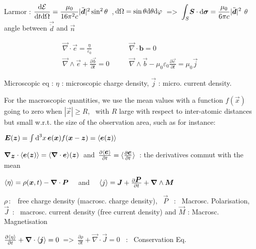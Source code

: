 \item Larmor : $\dfrac{\textrm{d} \mathcal{E}}{\textrm{d} t\textrm{d} \Omega} = \dfrac{\mu_0}{16\pi^2c}|\ddot{\mbox{\boldmath$d$}}|^2\sin^2\theta$ \,,$\,\textrm{d} \Omega = \sin\theta\textrm{d} \theta\textrm{d} \varphi \, $ => $\, \displaystyle{\int_{S}} \mbox{\boldmath$S$}\cdot\mbox{\boldmath$\textrm{d} \sigma$} = \dfrac{\mu_0}{6\pi c} |\ddot{\mbox{\boldmath$d$}}|^2$  $\theta$ angle between $ \vec{\ddot{d}}$ and $ \vec{n}$
\squishend

\squishlist
\item[] $$\boxed{\begin{split}
	\vec{\nabla}\cdot\vec{e} = \frac{\eta}{\varepsilon_0}  \qquad &\vec{\nabla} \cdot \boldsymbol{b} = 0\\
	\vec{\nabla}\wedge \vec{e} + \frac{\partial\vec{b}}{\partial t} =0 \qquad & \vec{\nabla} \wedge \vec{b} - \mu_0 \varepsilon_0 \frac{\partial \vec{e}}{\partial t} = \mu_0 \vec{j}
	\end{split}}$$
\item[] Microscopic eq : $\eta$ : microscopic charge density, $\vec{j}$ : micro. current density.

\item[] For the macroscopic quantities, we use the mean values with a function $f(\vec{x})$ going to zero when $|\vec{x}| \geq R$, \, with $R$ large with respect to inter-atomic distances but small w.r.t. the size of the observation area, such as for instance:

\item $\mbox{\boldmath$E$}(\mbox{\boldmath$z$}) = \int \textrm{d} ^3x \, \mbox{\boldmath$e$}(\mbox{\boldmath$x$})f(\mbox{\boldmath$x$}-\mbox{\boldmath$z$}) =  \langle\mbox{\boldmath$e$}(\mbox{\boldmath$z$})\rangle$

\item $\mbox{\boldmath$\nabla$}_{\mbox{\boldmath$z$}} \cdot \langle\mbox{\boldmath$e$}(\mbox{\boldmath$z$})\rangle = \langle\mbox{\boldmath$\nabla$} \cdot \mbox{\boldmath$e$}\rangle(\mbox{\boldmath$z$}) \, $ and  $\, \frac{\partial \langle\mbox{\boldmath$e$}\rangle}{\partial t} = \langle\frac{\partial \mbox{\boldmath$e$}}{\partial t}\rangle \,$ : the derivatives commut with the mean

\item $\langle\eta\rangle = \rho(\mbox{\boldmath$x$},t) - \mbox{\boldmath$\nabla$}\cdot\mbox{\boldmath$P$} \quad$ and  $\quad \langle j\rangle = \mbox{\boldmath$J$} + \frac{\partial \mbox{\boldmath$P$}}{\partial t} + \mbox{\boldmath$\nabla$} \wedge \mbox{\boldmath$M$}$

\item $\rho \, :$ \, free charge density (macrosc. charge density), \, $\vec{P}$ \, : \, Macrosc. Polarisation, \, $\vec{J} \,$ : \, macrosc. current density (free current density) and $\vec{M}$ : Macrosc. Magnetisation

\item $\frac{\partial \langle\eta\rangle}{\partial t} + \mbox{\boldmath$\nabla$}\cdot\langle\mbox{\boldmath$j$}\rangle = 0 \,$ => $\, \frac{\partial \rho}{\partial t} + \vec{\nabla}\cdot\vec{J} = 0$ \, : \, Conservation Eq.
\squishend
{}
\squishlist

